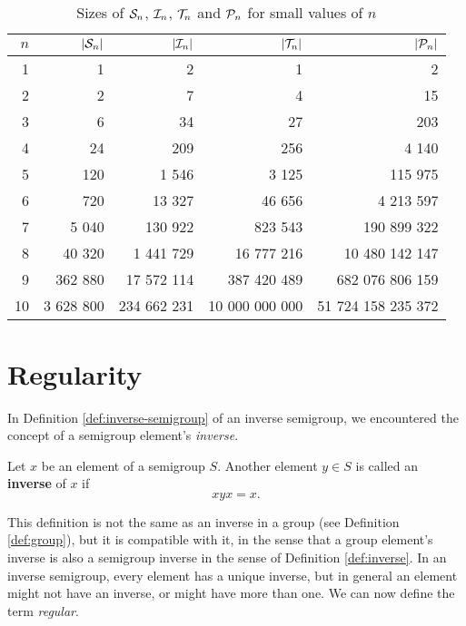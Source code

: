 \begin{table}[ht]
  \centering
  \renewcommand\arraystretch{1.0}
  \begin{tabular}{| r | r | r | r | r |}
    \hline
    $n$ & $|\mathcal{S}_n|$ & $|\mathcal{I}_n|$ & $|\mathcal{T}_n|$ & $|\mathcal{P}_n|$ \\
    \hline
     1 &         1&           2&              1&                  2 \\
     2 &         2&           7&              4&                 15 \\
     3 &         6&          34&             27&                203 \\
     4 &        24&         209&            256&              4 140 \\
     5 &       120&       1 546&          3 125&            115 975 \\
     6 &       720&      13 327&         46 656&          4 213 597 \\
     7 &     5 040&     130 922&        823 543&        190 899 322 \\
     8 &    40 320&   1 441 729&     16 777 216&     10 480 142 147 \\
     9 &   362 880&  17 572 114&    387 420 489&    682 076 806 159 \\
    10 & 3 628 800& 234 662 231& 10 000 000 000& 51 724 158 235 372 \\
    \hline
  \end{tabular}
  \renewcommand\arraystretch{0.7}
  \caption{Sizes of $\mathcal{S}_n$, $\mathcal{I}_n$, $\mathcal{T}_n$ and $\mathcal{P}_n$ for small values of
    $n$}
  \label{tab:pn-size}
\end{table}

\section{Regularity}
\label{sec:intro-regularity}

In Definition \ref{def:inverse-semigroup} of an inverse semigroup, we
encountered the concept of a semigroup element's \textit{inverse}.

\begin{definition}
  \label{def:inverse}
  Let $x$ be an element of a semigroup $S$.  Another element $y \in S$ is called
  an \textbf{inverse} of $x$ if
  $$xyx = x.$$
\end{definition}

This definition is not the same as an inverse in a group (see Definition
\ref{def:group}), but it is compatible with it, in the sense that a group
element's inverse is also a semigroup inverse in the sense of Definition
\ref{def:inverse}.  In an inverse semigroup, every element has a unique inverse,
but in general an element might not have an inverse, or might have more than
one.  We can now define the term \textit{regular}.

